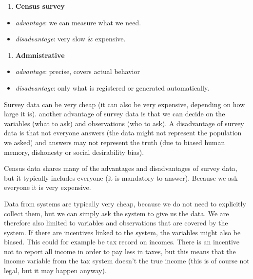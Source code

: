 \documentclass[]{book}
\providecommand{\tightlist}{%
  \setlength{\itemsep}{0pt}\setlength{\parskip}{0pt}}
\begin{document}
\begin{enumerate}
\def\labelenumi{\arabic{enumi}.}
\setcounter{enumi}{2}
\tightlist
\item
  \textbf{Census survey}
\end{enumerate}

\begin{itemize}
\tightlist
\item
  \emph{advantage}: we can measure what we need.
\item
  \emph{disadvantage}: very slow \& expensive.
\end{itemize}

\begin{enumerate}
\def\labelenumi{\arabic{enumi}.}
\setcounter{enumi}{3}
\tightlist
\item
  \textbf{Admnistrative}
\end{enumerate}

\begin{itemize}
\tightlist
\item
  \emph{advantage}: precise, covers actual behavior
\item
  \emph{disadvantage}: only what is registered or generated automatically.
\end{itemize}

Survey data can be very cheap (it can also be very expensive, depending on how large it is). another advantage of survey data is that we can decide on the variables (what to ask) and observations (who to ask). A disadvantage of survey data is that not everyone answers (the data might not represent the population we asked) and answers may not represent the truth (due to biased human memory, dishonesty or social desirability bias).

Census data shares many of the advantages and disadvantages of survey data, but it typically includes everyone (it is mandatory to answer). Because we ask everyone it is very expensive.

Data from systems are typically very cheap, because we do not need to explicitly collect them, but we can simply ask the system to give us the data. We are therefore also limited to variables and observations that are covered by the system. If there are incentives linked to the system, the variables might also be biased. This could for example be tax record on incomes. There is an incentive not to report all income in order to pay less in taxes, but this means that the income variable from the tax system doesn't the true income (this is of course not legal, but it may happen anyway).
\end{document}
